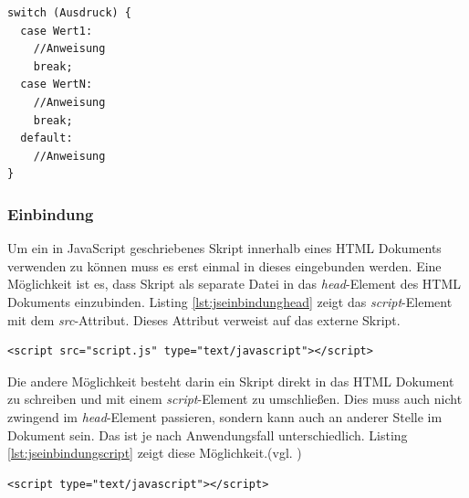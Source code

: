	\vspace{1em}
	\begin{lstlisting}[frame=htrbl, caption=Syntax Switch-Anweisung, label=lst:jssyntaxswitch]
switch (Ausdruck) {
  case Wert1:
    //Anweisung
    break;
  case WertN:
    //Anweisung
    break;
  default:
    //Anweisung
}
	\end{lstlisting}

\subsubsection{Einbindung} Um ein in JavaScript geschriebenes Skript innerhalb eines HTML Dokuments verwenden zu können muss es erst einmal in dieses eingebunden werden. Eine Möglichkeit ist es, dass Skript als separate Datei in das \textit{head}-Element des HTML Dokuments einzubinden. Listing \ref{lst:jseinbindunghead} zeigt das \textit{script}-Element mit dem \textit{src}-Attribut. Dieses Attribut verweist auf das externe Skript.

	\vspace{1em}
	\begin{lstlisting}[frame=htrbl, caption=JavaScript Einbindung als separate Datei im \textit{head}-Element, label=lst:jseinbindunghead]
<script src="script.js" type="text/javascript"></script>
	\end{lstlisting}

Die andere Möglichkeit besteht darin ein Skript direkt in das HTML Dokument zu schreiben und mit einem \textit{script}-Element zu umschließen. Dies muss auch nicht zwingend im \textit{head}-Element passieren, sondern kann auch an anderer Stelle im Dokument sein. Das ist je nach Anwendungsfall unterschiedlich. Listing \ref{lst:jseinbindungscript} zeigt diese Möglichkeit.(vgl. \cite[S.]{})

	\vspace{1em}
	\begin{lstlisting}[frame=htrbl, caption=JavaScript Einbindung in \textit{script}-Element, label=lst:jseinbindungscript]
<script type="text/javascript"></script>
	\end{lstlisting}

